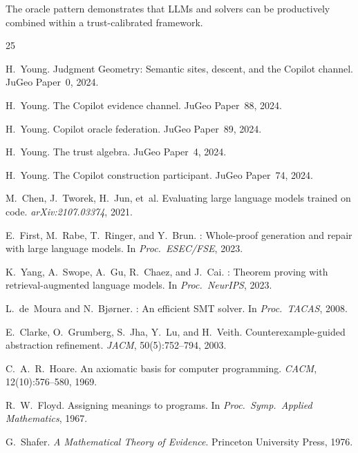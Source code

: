 \documentclass[11pt]{article}
\begin{document}
The oracle pattern demonstrates that LLMs and solvers can be
productively combined within a trust-calibrated framework.

\begin{thebibliography}{25}

H.~Young.
\newblock Judgment Geometry: Semantic sites, descent, and the
  Copilot channel.
\newblock JuGeo Paper~0, 2024.

H.~Young.
\newblock The Copilot evidence channel.
\newblock JuGeo Paper~88, 2024.

H.~Young.
\newblock Copilot oracle federation.
\newblock JuGeo Paper~89, 2024.

H.~Young.
\newblock The trust algebra.
\newblock JuGeo Paper~4, 2024.

H.~Young.
\newblock The Copilot construction participant.
\newblock JuGeo Paper~74, 2024.

M.~Chen, J.~Tworek, H.~Jun, et~al.
\newblock Evaluating large language models trained on code.
\newblock \emph{arXiv:2107.03374}, 2021.

E.~First, M.~Rabe, T.~Ringer, and Y.~Brun.
: Whole-proof generation and repair with large
  language models.
\newblock In \emph{Proc.\ ESEC/FSE}, 2023.

K.~Yang, A.~Swope, A.~Gu, R.~Chaez, and J.~Cai.
: Theorem proving with retrieval-augmented
  language models.
\newblock In \emph{Proc.\ NeurIPS}, 2023.

L.~de~Moura and N.~Bj{\o}rner.
: An efficient {SMT} solver.
\newblock In \emph{Proc.\ TACAS}, 2008.

E.~Clarke, O.~Grumberg, S.~Jha, Y.~Lu, and H.~Veith.
\newblock Counterexample-guided abstraction refinement.
\newblock \emph{JACM}, 50(5):752--794, 2003.

C.~A.~R.~Hoare.
\newblock An axiomatic basis for computer programming.
\newblock \emph{CACM}, 12(10):576--580, 1969.

R.~W.~Floyd.
\newblock Assigning meanings to programs.
\newblock In \emph{Proc.\ Symp.\ Applied Mathematics}, 1967.

G.~Shafer.
\newblock \emph{A Mathematical Theory of Evidence}.
\newblock Princeton University Press, 1976.


\end{thebibliography}
\end{document}
